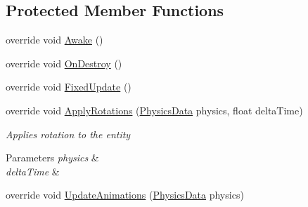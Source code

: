 \subsection*{Protected Member Functions}
\begin{DoxyCompactItemize}
\item 
\hypertarget{class_skyrates_1_1_entity_1_1_entity_player_ship_a0b37ded3d1ec394e438162dea44267a0}{override void \hyperlink{class_skyrates_1_1_entity_1_1_entity_player_ship_a0b37ded3d1ec394e438162dea44267a0}{Awake} ()}\label{class_skyrates_1_1_entity_1_1_entity_player_ship_a0b37ded3d1ec394e438162dea44267a0}

\item 
\hypertarget{class_skyrates_1_1_entity_1_1_entity_player_ship_a3ec87decde48c47efda4fe077a657595}{override void \hyperlink{class_skyrates_1_1_entity_1_1_entity_player_ship_a3ec87decde48c47efda4fe077a657595}{On\-Destroy} ()}\label{class_skyrates_1_1_entity_1_1_entity_player_ship_a3ec87decde48c47efda4fe077a657595}

\item 
\hypertarget{class_skyrates_1_1_entity_1_1_entity_player_ship_a29f6fb7474024c577fdf251ef52ce2fd}{override void \hyperlink{class_skyrates_1_1_entity_1_1_entity_player_ship_a29f6fb7474024c577fdf251ef52ce2fd}{Fixed\-Update} ()}\label{class_skyrates_1_1_entity_1_1_entity_player_ship_a29f6fb7474024c577fdf251ef52ce2fd}

\item 
\hypertarget{class_skyrates_1_1_entity_1_1_entity_player_ship_a732afbeabe9403b7be8b8c283bd6962a}{override void \hyperlink{class_skyrates_1_1_entity_1_1_entity_player_ship_a732afbeabe9403b7be8b8c283bd6962a}{Apply\-Rotations} (\hyperlink{class_skyrates_1_1_physics_1_1_physics_data}{Physics\-Data} physics, float delta\-Time)}\label{class_skyrates_1_1_entity_1_1_entity_player_ship_a732afbeabe9403b7be8b8c283bd6962a}

\begin{DoxyCompactList}\small\item\em Applies rotation to the entity 


\begin{DoxyParams}{Parameters}
{\em physics} & \\
\hline
{\em delta\-Time} & \\
\hline
\end{DoxyParams}
 \end{DoxyCompactList}\item 
\hypertarget{class_skyrates_1_1_entity_1_1_entity_player_ship_a5c786d11582c22d9ab800ed457449801}{override void \hyperlink{class_skyrates_1_1_entity_1_1_entity_player_ship_a5c786d11582c22d9ab800ed457449801}{Update\-Animations} (\hyperlink{class_skyrates_1_1_physics_1_1_physics_data}{Physics\-Data} physics)}\label{class_skyrates_1_1_entity_1_1_entity_player_ship_a5c786d11582c22d9ab800ed457449801}


\end{DoxyCompactItemize}
